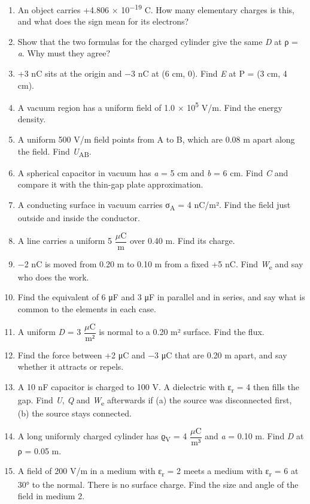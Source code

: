 \documentclass[11pt]{article}
\begin{document}
\begin{keepsection}
\begin{enumerate}
\item An object carries +4.806 \ensuremath{\times} 10\textsuperscript{\ensuremath{-}19} C. How many elementary charges is this, and what does the sign mean for its electrons?
\item Show that the two formulas for the charged cylinder give the same \textit{D} at ρ = \textit{a}. Why must they agree?
\item +3 nC sits at the origin and \ensuremath{-}3 nC at (6 cm, 0). Find \textit{E} at P = (3 cm, 4 cm).
\item A vacuum region has a uniform field of 1.0 \ensuremath{\times} 10\textsuperscript{5} V/m. Find the energy density.
\item A uniform 500 V/m field points from A to B, which are 0.08 m apart along the field. Find \textit{U}\textsubscript{AB}.
\item A spherical capacitor in vacuum has \textit{a} = 5 cm and \textit{b} = 6 cm. Find \textit{C} and compare it with the thin-gap plate approximation.
\item A conducting surface in vacuum carries σ\textsubscript{A} = 4 nC/m². Find the field just outside and inside the conductor.
\item A line carries a uniform 5 {\small\ensuremath{\dfrac{μ\mathrm{C}}{\mathrm{m}}}} over 0.40 m. Find its charge.
\item \ensuremath{-}2 nC is moved from 0.20 m to 0.10 m from a fixed +5 nC. Find \textit{W}\textsubscript{e} and say who does the work.
\item Find the equivalent of 6 μF and 3 μF in parallel and in series, and say what is common to the elements in each case.
\item A uniform \textit{D} = 3 {\small\ensuremath{\dfrac{μ\mathrm{C}}{\mathrm{m}²}}} is normal to a 0.20 m² surface. Find the flux.
\item Find the force between +2 μC and \ensuremath{-}3 μC that are 0.20 m apart, and say whether it attracts or repels.
\item A 10 nF capacitor is charged to 100 V. A dielectric with ε\textsubscript{r} = 4 then fills the gap. Find \textit{U}, \textit{Q} and \textit{W}\textsubscript{e} afterwards if (a) the source was disconnected first, (b) the source stays connected.
\item A long uniformly charged cylinder has ϱ\textsubscript{V} = 4 {\small\ensuremath{\dfrac{μ\mathrm{C}}{\mathrm{m}³}}} and \textit{a} = 0.10 m. Find \textit{D} at ρ = 0.05 m.
\item A field of 200 V/m in a medium with ε\textsubscript{r} = 2 meets a medium with ε\textsubscript{r} = 6 at 30° to the normal. There is no surface charge. Find the size and angle of the field in medium 2.

\end{enumerate}
\end{keepsection}
\end{document}
